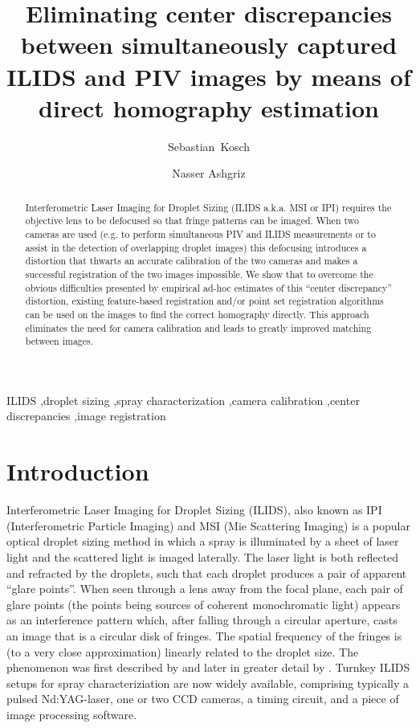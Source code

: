 \documentclass[preprint]{elsarticle}
\begin{document}
 \title{Eliminating center discrepancies
between simultaneously captured ILIDS and PIV images by means of direct
homography estimation}
\author[mie]{Sebastian~Kosch}
\author[mie]{Nasser Ashgriz}
\address[mie]{Department of Industrial and Mechanical Engineering, University of Toronto}
    \begin{abstract} Interferometric Laser Imaging for Droplet Sizing (ILIDS
        a.k.a. MSI or IPI) requires the objective lens to be defocused so that
        fringe patterns can be imaged. When two cameras are used (e.g. to
        perform simultaneous PIV and ILIDS measurements or to assist in the
        detection of overlapping droplet images) this defocusing introduces a
        distortion that thwarts an accurate calibration of the two cameras
        and makes a successful registration of the two images impossible. We
        show that to overcome the obvious difficulties presented by empirical ad-hoc
        estimates of this ``center discrepancy'' distortion,  existing
        feature-based registration and/or point set registration algorithms can
        be used on the images to find the correct homography directly. This
        approach eliminates the need for camera calibration and leads to greatly
    improved matching between images.
\end{abstract}
\begin{keyword}
    ILIDS \sep droplet sizing \sep spray characterization \sep camera
    calibration \sep center discrepancies \sep image registration
\end{keyword}
\maketitle

\section{Introduction} Interferometric Laser Imaging for Droplet Sizing (ILIDS),
also known as IPI (Interferometric Particle Imaging) and MSI (Mie Scattering
Imaging) is a popular optical droplet sizing method in which a spray is illuminated by
a sheet of laser light and the scattered light is imaged laterally. The laser
light is both reflected and refracted by the droplets, such that each droplet
produces a pair of apparent ``glare points''. When seen through a lens away
from the focal plane, each pair of glare points (the points being sources of coherent
monochromatic light) appears as an interference pattern which, after falling through
a circular aperture, casts an image that is a circular disk of fringes.
The spatial frequency of the fringes is (to a very close approximation) linearly
related to the droplet size. The phenomenon was first described by
\citet{Konig86} and later in greater detail by \citet{Glover95}. Turnkey ILIDS
setups for spray characteriziation are now widely available, comprising
typically a pulsed Nd:YAG-laser, one or two CCD cameras, a timing circuit, and a
piece of image processing software.
\end{document}
